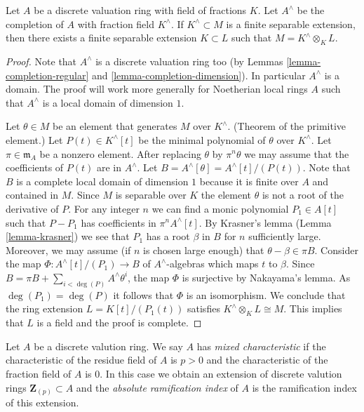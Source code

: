 \begin{lemma}
\label{lemma-approximate-separable-extension}
Let $A$ be a discrete valuation ring with field of fractions $K$.
Let $A^\wedge$ be the completion of $A$ with fraction field $K^\wedge$.
If $K^\wedge \subset M$ is a finite separable extension, then
there exists a finite separable extension $K \subset L$
such that $M = K^\wedge \otimes_K L$.
\end{lemma}

\begin{proof}
Note that $A^\wedge$ is a discrete valuation ring too (by
Lemmas \ref{lemma-completion-regular} and \ref{lemma-completion-dimension}).
In particular $A^\wedge$ is a domain. The proof will work more generally
for Noetherian local rings $A$ such that $A^\wedge$ is a local domain
of dimension $1$.

\medskip\noindent
Let $\theta \in M$ be an element that generates $M$ over $K^\wedge$.
(Theorem of the primitive element.)
Let $P(t) \in K^\wedge[t]$ be the minimal polynomial of $\theta$ over
$K^\wedge$. Let $\pi \in \mathfrak m_A$ be a nonzero element.
After replacing $\theta$ by $\pi^n\theta$ we may assume that
the coefficients of $P(t)$ are in $A^\wedge$. Let
$B = A^\wedge[\theta] = A^\wedge[t]/(P(t))$. Note that $B$ is
a complete local domain of dimension $1$ because it is finite over $A$ and
contained in $M$. Since $M$ is separable over $K$ the element $\theta$
is not a root of the derivative of $P$. For any integer $n$ we can find
a monic polynomial $P_1 \in A[t]$ such that $P - P_1$ has coefficients in
$\pi^nA^\wedge[t]$. By Krasner's lemma (Lemma \ref{lemma-krasner}) we see that
$P_1$ has a root $\beta$ in $B$ for $n$ sufficiently large.
Moreover, we may assume (if $n$ is chosen large enough)
that $\theta - \beta \in \pi B$. Consider the map
$\Phi : A^\wedge[t]/(P_1) \to B$ of $A^\wedge$-algebras
which maps $t$ to $\beta$. Since
$B = \pi B + \sum_{i < \deg(P)} A^\wedge \theta^i$, the map $\Phi$
is surjective by Nakayama's lemma. As $\deg(P_1) = \deg(P)$ it
follows that $\Phi$ is an isomorphism. We conclude that the ring
extension $L = K[t]/(P_1(t))$ satisfies $K^\wedge \otimes_K L \cong M$.
This implies that $L$ is a field and the proof is complete.
\end{proof}

\begin{definition}
\label{definition-mixed}
Let $A$ be a discrete valution ring. We say $A$ has {\it mixed characteristic}
if the characteristic of the residue field of $A$ is $p > 0$ and the
characteristic of the fraction field of $A$ is $0$.
In this case we obtain an extension of discrete valution rings
$\mathbf{Z}_{(p)} \subset A$ and the {\it absolute ramification index}
of $A$ is the ramification index of this extension.
\end{definition}





